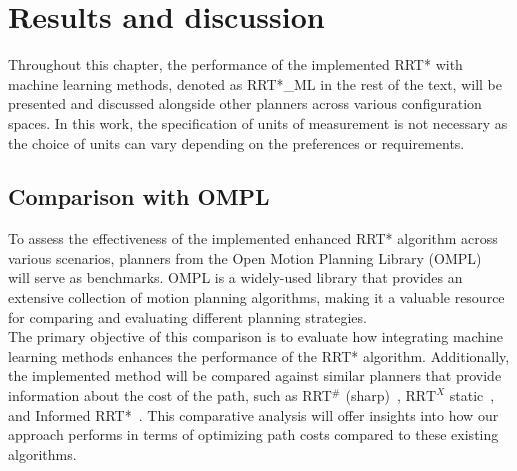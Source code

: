 \documentclass{ctuthesis}
\begin{document}
\chapter{Results and discussion} 
\label{chap:Result} 
Throughout this chapter, 
the performance of the implemented RRT* with machine learning methods, 
denoted as RRT*\_ML in the rest of the text,
will be presented and discussed 
alongside other planners across various configuration spaces. 
In this work, the specification of units of measurement is not necessary 
as the choice of units can vary depending on the preferences or requirements.
\section{Comparison with OMPL}
To assess the effectiveness of the implemented enhanced RRT* algorithm across various scenarios, 
planners from the Open Motion Planning Library (OMPL)~\cite{Ioan2012ompl} 
will serve as benchmarks. 
OMPL is a widely-used library that provides an extensive collection of motion planning algorithms,
making it a valuable resource for comparing and evaluating different planning strategies. 
\\[12pt]
The primary objective of this comparison is to evaluate how integrating 
machine learning methods enhances the performance of the RRT* algorithm. 
Additionally, 
the implemented method will be compared against similar planners that provide 
information about the cost of the path, 
such as RRT$^\#$ (sharp)~\cite{arslan2012rrtsharp}, $\text{RRT}^X$ static~\cite{Otte2015RRTX}, 
and Informed RRT*~\cite{Gammell2018InformedRRTstar}. 
This comparative analysis will offer insights into how our approach 
performs in terms of optimizing path costs compared to these existing algorithms. 
\end{document}
